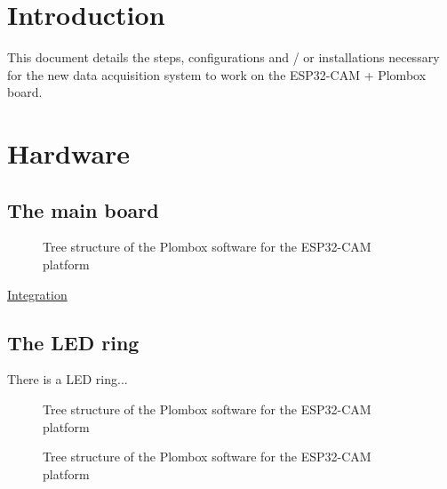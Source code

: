 \documentclass[a4paper,11pt]{article}
\begin{document}
\section{Introduction}
This document details the steps, configurations and / or
installations necessary for the new data acquisition system to work on the
ESP32-CAM + Plombox board.

\section{Hardware}
\subsection{The main board}
\begin{figure}[!h]
  \centering
	\caption{Tree structure of the Plombox software for the ESP32-CAM platform}
  \label{fig_main_board}
\end{figure}

\href{https://gitlab.com/plombox/plombox-esp32cam/-/tree/master/integration}{Integration}
\subsection{The LED ring}
There is a LED ring...
\begin{figure}[!h]
  \centering
	\caption{Tree structure of the Plombox software for the ESP32-CAM platform}
  \label{fig_ring_ada}
\end{figure}
\begin{figure}[!h]
  \centering
	\caption{Tree structure of the Plombox software for the ESP32-CAM platform}
  \label{fig_ring_fb}
\end{figure}
\end{document}
